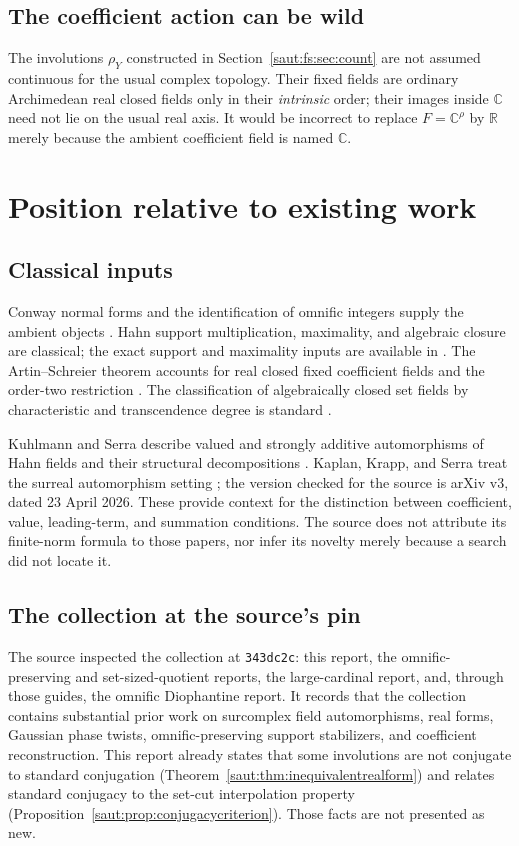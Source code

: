 \documentclass[11pt]{article}
\theoremstyle{definition}
\theoremstyle{remark}
\newcommand{\R}{\mathbb R}
\newcommand{\C}{\mathbb C}
\numberwithin{equation}{section}
\begin{document}
\subsection{The coefficient action can be wild}

The involutions $\rho_Y$ constructed in Section~\ref{saut:fs:sec:count} are not assumed
continuous for the usual complex topology. Their fixed fields are ordinary
Archimedean real closed fields only in their \emph{intrinsic} order; their images
inside $\C$ need not lie on the usual real axis. It would be incorrect to replace
$F=\C^\rho$ by $\R$ merely because the ambient coefficient field is named $\C$.

\section{Position relative to existing work}\label{saut:fs:sec:position}

\subsection{Classical inputs}

Conway normal forms and the identification of omnific integers supply the ambient
objects \cite{Conway,Gonshor}. Hahn support multiplication, maximality, and algebraic
closure are classical; the exact support and maximality inputs are available in
\cite{Poonen}. The Artin--Schreier theorem accounts for real closed fixed coefficient
fields and the order-two restriction \cite{Conrad}. The classification of
algebraically closed set fields by characteristic and transcendence degree is
standard \cite{Lang}.

Kuhlmann and Serra describe valued and strongly additive automorphisms of Hahn fields
and their structural decompositions \cite{KS}. Kaplan, Krapp, and Serra treat the
surreal automorphism setting \cite{KKS}; the version checked for the source is arXiv
v3, dated 23 April 2026. These provide context for the distinction between
coefficient, value, leading-term, and summation conditions. The source does not
attribute its finite-norm formula to those papers, nor infer its novelty merely
because a search did not locate it.

\subsection{The collection at the source's pin}

The source inspected the collection at \texttt{343dc2c}: this report, the
omnific-preserving and set-sized-quotient reports, the large-cardinal report, and,
through those guides, the omnific Diophantine report. It records that the collection
contains substantial prior work on surcomplex field automorphisms, real forms,
Gaussian phase twists, omnific-preserving support stabilizers, and coefficient
reconstruction. This report already states that some involutions are not conjugate to
standard conjugation (Theorem~\ref{saut:thm:inequivalentrealform}) and relates
standard conjugacy to the set-cut interpolation property
(Proposition~\ref{saut:prop:conjugacycriterion}). Those facts are not presented as
new.
\end{document}
